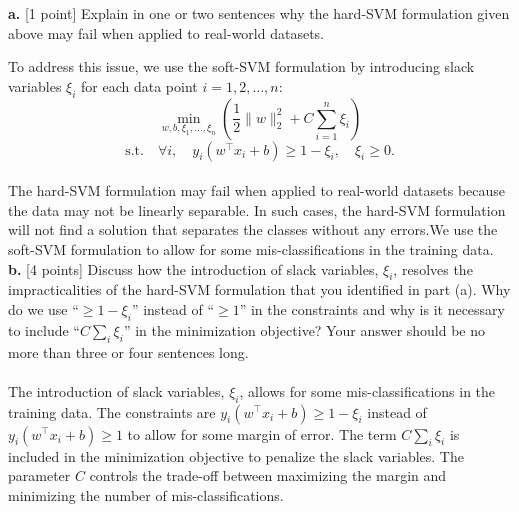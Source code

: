 \documentclass[a3paper,12pt]{extarticle} %
\begin{document}
\noindent \textbf{a.} [1 point] Explain in one or two sentences why the hard-SVM formulation given above may fail when applied to real-world datasets.

To address this issue, we use the soft-SVM formulation by introducing slack variables $\xi_i$ for each data point $i = 1, 2, \ldots, n$:
\[
\min_{w, b, \xi_1, \ldots, \xi_n} \left( \frac{1}{2} \|w\|_2^2 + C \sum_{i=1}^n \xi_i \right)
\]
\[
\text{s.t.} \quad \forall i, \quad y_i(w^\top x_i + b) \geq 1 - \xi_i, \quad \xi_i \geq 0.
\]
\\ The hard-SVM formulation may fail when applied to real-world datasets because the data may not be linearly separable. In such cases, the hard-SVM formulation will not find a solution that separates the classes without any errors.We use the soft-SVM formulation to allow for some mis-classifications in the training data.\\

\noindent \textbf{b.} [4 points] Discuss how the introduction of slack variables, $\xi_i$, resolves the impracticalities of the hard-SVM formulation that you identified in part (a). Why do we use “$\geq 1 - \xi_i$” instead of “$\geq 1$” in the constraints and why is it necessary to include “$C \sum_i \xi_i$” in the minimization objective? Your answer should be no more than three or four sentences long.
\\\\ The introduction of slack variables, \( \xi_i \), allows for some mis-classifications in the training data. The constraints are \( y_i(w^\top x_i + b) \geq 1 - \xi_i \) instead of \( y_i(w^\top x_i + b) \geq 1 \) to allow for some margin of error. The term \( C \sum_i \xi_i \) is included in the minimization objective to penalize the slack variables. The parameter \( C \) controls the trade-off between maximizing the margin and minimizing the number of mis-classifications.\\
\end{document}
